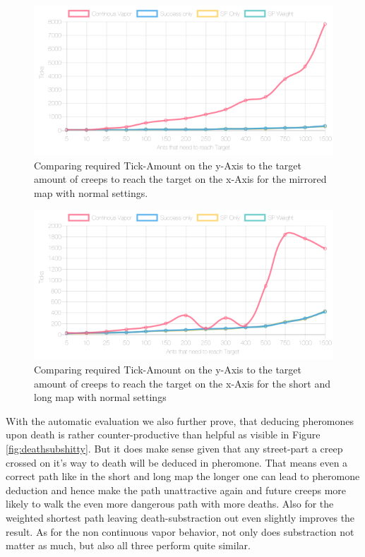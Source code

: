 \begin{figure}[H]
  \centering
  \includegraphics[width=1\linewidth]{images/normalmirroredwithtower-ticks-line}
  \caption{Comparing required Tick-Amount on the y-Axis to the target amount of creeps to reach the target on the x-Axis for the mirrored map with normal settings.}
  \label{fig:mirrorvaptick}
\end{figure}

\begin{figure}[H]
  \centering
  \includegraphics[width=1\linewidth]{images/normalshortandlongwithtowers-ticks-line}
  \caption{Comparing required Tick-Amount on the y-Axis to the target amount of creeps to reach the target on the x-Axis for the short and long map with normal settings}
  \label{fig:shortlongvaptick}
\end{figure}

With the automatic evaluation we also further prove, that deducing pheromones upon death is rather counter-productive than helpful as visible in Figure \ref{fig:deathsubshitty}. But it does make sense given that any street-part a creep crossed on it's way to death will be deduced in pheromone. That means even a correct path like in the short and long map the longer one can lead to pheromone deduction and hence make the path unattractive again and future creeps more likely to walk the even more dangerous path with more deaths.
Also for the weighted shortest path leaving death-substraction out even slightly improves the result. As for the non continuous vapor behavior, not only does substraction not matter as much, but also all three perform quite similar.


